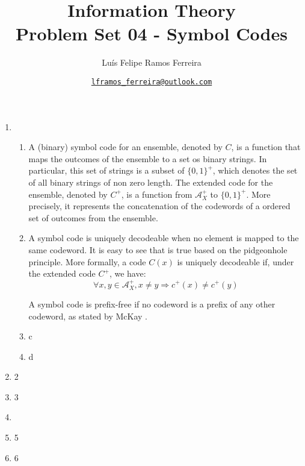 \documentclass{article}
\title{Information Theory \\ \large Problem Set 04 - Symbol Codes}
\author{Luís Felipe Ramos Ferreira}
\date{\href{mailto:lframos\_ferreira@outlook.com}{\texttt{lframos\_ferreira@outlook.com}}
}
\begin{document}
\maketitle

\begin{enumerate}
	\item \begin{enumerate}
		      \item A (binary) symbol code for an ensemble, denoted by \(C\), is a function that maps the outcomes of the ensemble to a set os binary strings. In particular, this set of strings is a subset of \(\{0, 1\}^+\), which denotes the set of all binary strings of non zero length. The extended code for the ensemble, denoted by \(C^+\), is a function from \(\mathcal{A}_X^+\) to \(\{0, 1\}^+\). More precisely, it represents the concatenation of the codewords of a ordered set of outcomes from the ensemble.
		      \item A symbol code is uniquely decodeable when no element is mapped to the same codeword. It is easy to see that is true based on the pidgeonhole principle. More formally, a code \(C(x)\) is uniquely decodeable if, under the extended code \(C^+\), we have:
		            \[\forall x, y \in \mathcal{A}_X^+, x \neq y \Rightarrow c^+(x) \neq c^+(y)\]

                    A symbol code is prefix-free if no codeword is a prefix of any other codeword, as stated by McKay \cite{MacKay}.
		      \item c
		      \item d
	      \end{enumerate}

	\item 2
	\item 3
	\item \begin{enumerate}

	      \end{enumerate}
	\item 5
	\item 6
\end{enumerate}


\end{document}
